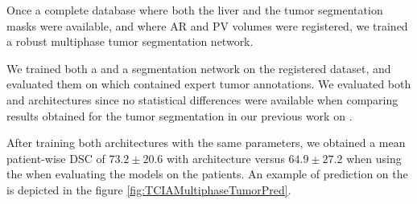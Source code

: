 Once a complete database where both the liver and the tumor segmentation
masks were available, and where AR and PV volumes were registered, we
trained a robust multiphase tumor segmentation network.

We trained both a  and a  segmentation network on the
registered  dataset, and evaluated them on  which
contained expert tumor annotations. We evaluated both  and 
architectures since no statistical differences were available when
comparing results obtained for the tumor segmentation in our previous
work on  \cite{Ouhmich2019}.

After training both architectures with
the same parameters, we obtained a mean patient-wise DSC of $ 73.2 \pm 20.6 $ with 
architecture versus $ 64.9 \pm 27.2 $ when using the  when evaluating the
models on the  patients. An example of prediction on the  is
depicted in the figure \ref{fig:TCIAMultiphaseTumorPred}.

